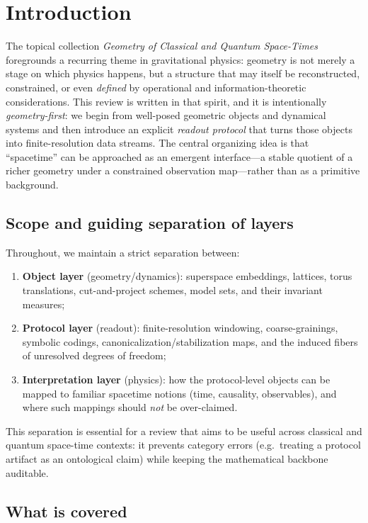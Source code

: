 \section{Introduction}

The topical collection \emph{Geometry of Classical and Quantum Space-Times} foregrounds a recurring theme in gravitational physics: geometry is not merely a stage on which physics happens, but a structure that may itself be reconstructed, constrained, or even \emph{defined} by operational and information-theoretic considerations. This review is written in that spirit, and it is intentionally \emph{geometry-first}: we begin from well-posed geometric objects and dynamical systems and then introduce an explicit \emph{readout protocol} that turns those objects into finite-resolution data streams. The central organizing idea is that ``spacetime'' can be approached as an emergent interface---a stable quotient of a richer geometry under a constrained observation map---rather than as a primitive background.

\subsection{Scope and guiding separation of layers}

Throughout, we maintain a strict separation between:
\begin{enumerate}[label=(\roman*),leftmargin=*,itemsep=2pt]
  \item \textbf{Object layer} (geometry/dynamics): superspace embeddings, lattices, torus translations, cut-and-project schemes, model sets, and their invariant measures;
  \item \textbf{Protocol layer} (readout): finite-resolution windowing, coarse-grainings, symbolic codings, canonicalization/stabilization maps, and the induced fibers of unresolved degrees of freedom;
  \item \textbf{Interpretation layer} (physics): how the protocol-level objects can be mapped to familiar spacetime notions (time, causality, observables), and where such mappings should \emph{not} be over-claimed.
\end{enumerate}
This separation is essential for a review that aims to be useful across classical and quantum space-time contexts: it prevents category errors (e.g.\ treating a protocol artifact as an ontological claim) while keeping the mathematical backbone auditable.

\subsection{What is covered}

